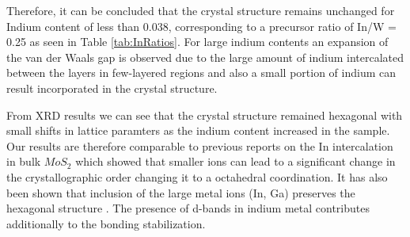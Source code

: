 Therefore, it can be concluded that the crystal structure remains unchanged for Indium content of less than 0.038, corresponding to a precursor ratio of In/W = 0.25 as seen in Table \ref{tab:InRatios}. For large indium contents an expansion of the van der Waals gap is observed due to the large amount of indium intercalated between the layers in few-layered regions and also a small portion of indium can result incorporated in the crystal structure. 

From XRD results we can see that the crystal structure remained hexagonal with small shifts in lattice paramters as the indium content increased in the sample. Our results are therefore comparable to previous reports on the In intercalation in bulk $MoS_2$ which showed that smaller ions can lead to a significant change in the crystallographic order \cite{Somoano1979} changing it to a octahedral coordination. It has also been shown that inclusion of the large metal ions (In, Ga) preserves the hexagonal structure \cite{Somoano1979}. The presence of d-bands in indium metal contributes additionally to the bonding stabilization.

